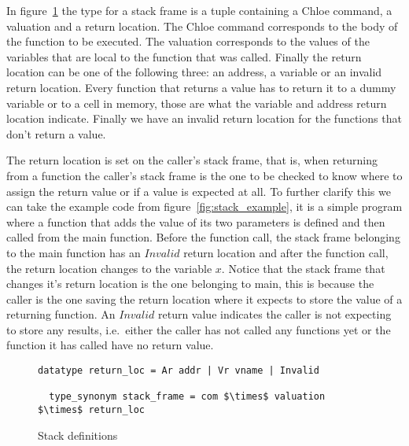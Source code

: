 In figure~\ref{fig:stack_def} the type for a stack frame is a tuple containing a Chloe command, a valuation and a return location.
The Chloe command corresponds to the body of the function to be executed.
The valuation corresponds to the values of the variables that are local to the function that was called.
Finally the return location can be one of the following three: an address, a variable or an invalid return location.
Every function that returns a value has to return it to a dummy variable or to a cell in memory, those are what the variable and address return location indicate.
Finally we have an invalid return location for the functions that don't return a value.

The return location is set on the caller's stack frame, that is, when returning from a function the caller's stack frame is the one to be checked to know where to assign the return value or if a value is expected at all.
To further clarify this we can take the example code from figure~\ref{fig:stack_example}, it is a simple program where a function that adds the value of its two parameters is defined and then called from the main function.
Before the function call, the stack frame belonging to the main function has an $Invalid$ return location and after the function call, the return location changes to the variable $x$.
Notice that the stack frame that changes it's return location is the one belonging to main, this is because the caller is the one saving the return location where it expects to store the value of a returning function.
An $Invalid$ return value indicates the caller is not expecting to store any results, i.e.\ either the caller has not called any functions yet or the function it has called have no return value.

\begin{figure}
  \begin{lstlisting}[frame=single, mathescape=true]
  datatype return_loc = Ar addr | Vr vname | Invalid

  type_synonym stack_frame = com $\times$ valuation $\times$ return_loc
  \end{lstlisting}

  \caption{Stack definitions}
  \label{fig:stack_def}
\end{figure}


